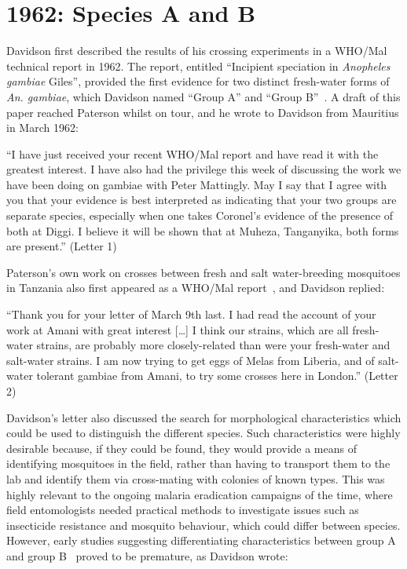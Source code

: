 \documentclass[a4paper,11pt,abstracton,hidelinks]{scrartcl}
\begin{document}
\section{1962: Species A and B}\label{sec:1962}


Davidson first described the results of his crossing experiments in a WHO/Mal technical report in 1962.
%
The report, entitled ``Incipient speciation in \textit{Anopheles gambiae} Giles'', 
provided the first evidence for two distinct fresh-water forms of \textit{An. gambiae}, which Davidson named ``Group A'' and ``Group B''~\parencite{Davidson1962a}.
%
A draft of this paper reached Paterson whilst on tour, and he wrote to Davidson from Mauritius in March 1962:


\begin{displayquote}
``I have just received your recent WHO/Mal report and have read it with the greatest interest. I have also had the privilege this week of discussing the work we have been doing on gambiae with Peter Mattingly. May I say that I agree with you that your evidence is best interpreted as indicating that your two groups are separate species, especially when one takes Coronel's evidence of the presence of both at Diggi. I believe it will be shown that at Muheza, Tanganyika, both forms are present.'' (Letter 1)
\end{displayquote}


Paterson's own work on crosses between fresh and salt water-breeding mosquitoes in Tanzania also first appeared as a WHO/Mal report~\parencite{Paterson1962a}, and Davidson replied:


\begin{displayquote}
``Thank you for your letter of March 9th last. I had read the account of your work at Amani with great interest [\ldots] I think our strains, which are all fresh-water strains, are probably more closely-related than were your fresh-water and salt-water strains. I am now trying to get eggs of Melas from Liberia, and of salt-water tolerant gambiae from Amani, to try some crosses here in London.'' (Letter 2)
\end{displayquote}


Davidson's letter also discussed the search for morphological characteristics which could be used to distinguish the different species.
%
Such characteristics were highly desirable because, if they could be found, they would provide a means of identifying mosquitoes in the field, rather than having to transport them to the lab and identify them via cross-mating with colonies of known types.
%
This was highly relevant to the ongoing malaria eradication campaigns of the time, where field entomologists needed practical methods to investigate issues such as insecticide resistance and mosquito behaviour, which could differ between species.
%
However, early studies suggesting differentiating characteristics between group A and group B~\parencite{Coronel1962} proved to be premature, as Davidson wrote:
\end{document}
